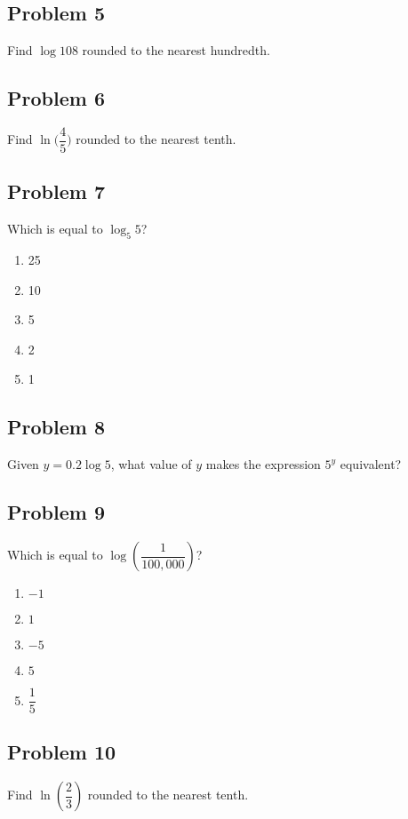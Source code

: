 \documentclass[12pt]{article}
\begin{document}
\subsection*{Problem 5}
Find \( \log 108 \) rounded to the nearest hundredth.

\subsection*{Problem 6}
Find \( \ln\Big(\dfrac{4}{5}\Big) \) rounded to the nearest tenth.

\subsection*{Problem 7}
Which is equal to \(\log_5 5 \)?

\begin{enumerate}[label=(\alph*)]
    \item 25
    \item 10
    \item 5
    \item 2
    \item 1
\end{enumerate}

\subsection*{Problem 8}
Given \( y = 0.2 \log 5 \), what value of \( y \) makes the expression \( 5^y \) equivalent?

\subsection*{Problem 9}
Which is equal to \( \log \left( \dfrac{1}{100,000} \right) \)?

\begin{enumerate}[label=(\alph*)]
    \item \(-1\)
    \item \(1\)
    \item \(-5\)
    \item \(5\)
    \item \( \dfrac{1}{5} \)
\end{enumerate}

\subsection*{Problem 10}
Find \( \ln\left(\dfrac{2}{3}\right) \) rounded to the nearest tenth.
\end{document}
